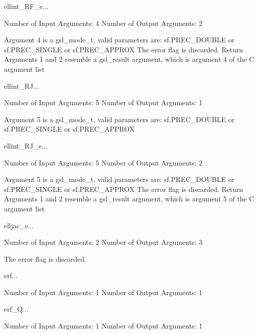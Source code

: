 \begin{funcdesc}{ellint_RF_e}{...}

    Number of Input  Arguments:  4
    Number of Output Arguments:  2

 Argument 4 is a gsl_mode_t, valid parameters are:
	sf.PREC_DOUBLE or sf.PREC_SINGLE or sf.PREC_APPROX
The error flag is discarded.
Return Arguments 1 and 2 resemble a gsl_result argument,
	which is  argument 4 of the C argument list

\end{funcdesc}

\begin{funcdesc}{ellint_RJ}{...}

    Number of Input  Arguments:  5
    Number of Output Arguments:  1

 Argument 5 is a gsl_mode_t, valid parameters are:
	sf.PREC_DOUBLE or sf.PREC_SINGLE or sf.PREC_APPROX

\end{funcdesc}

\begin{funcdesc}{ellint_RJ_e}{...}

    Number of Input  Arguments:  5
    Number of Output Arguments:  2

 Argument 5 is a gsl_mode_t, valid parameters are:
	sf.PREC_DOUBLE or sf.PREC_SINGLE or sf.PREC_APPROX
The error flag is discarded.
Return Arguments 1 and 2 resemble a gsl_result argument,
	which is  argument 5 of the C argument list

\end{funcdesc}

\begin{funcdesc}{elljac_e}{...}

    Number of Input  Arguments:  2
    Number of Output Arguments:  3

The error flag is discarded.

\end{funcdesc}

\begin{funcdesc}{erf}{...}

    Number of Input  Arguments:  1
    Number of Output Arguments:  1
\end{funcdesc}

\begin{funcdesc}{erf_Q}{...}

    Number of Input  Arguments:  1
    Number of Output Arguments:  1
\end{funcdesc}

